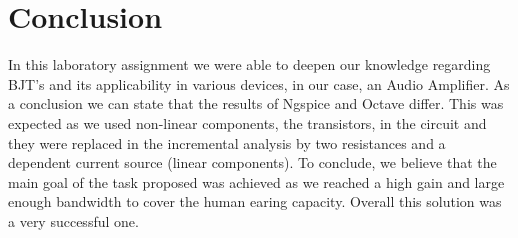 \section{Conclusion}
\label{resan}
In this laboratory assignment we were able to deepen our knowledge regarding BJT's and its applicability in various devices, in our case, an Audio Amplifier. 
As a conclusion we can state that the results of Ngspice and Octave differ. This was expected as we used non-linear components, the transistors, in the circuit and they were replaced in the incremental analysis by two resistances and a dependent current source (linear components).
To conclude, we believe that the main goal of the task proposed was achieved as we reached a high gain and large enough bandwidth to cover the human earing capacity.  Overall this solution was a very successful one.  

